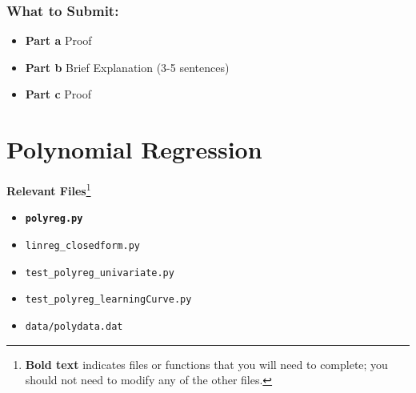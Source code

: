 \documentclass{article}
\begin{document}
\begin{bprob}
    \subsubsection*{What to Submit:}
    \begin{itemize}
        \item \textbf{Part a} Proof
        \item \textbf{Part b} Brief Explanation (3-5 sentences)
        \item \textbf{Part c} Proof
    \end{itemize}
\end{bprob}

\section*{Polynomial Regression}
{\bf Relevant Files}\footnote{{\bf Bold text} indicates files or functions that you will need to complete; you should not need to modify any of the other files.}
\vspace{-1.2em}
\begin{multicols}{2}
    \begin{itemize}[noitemsep,nolistsep]
        \item \texttt{\bf polyreg.py}
        \item \texttt{linreg\_closedform.py}
        \item \texttt{test\_polyreg\_univariate.py}
        \item \texttt{test\_polyreg\_learningCurve.py}
        \item \texttt{data/polydata.dat}
    \end{itemize}
\end{multicols}
\end{document}
